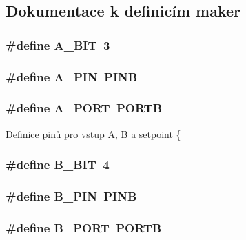 \subsection{Dokumentace k definicím maker}
\subsubsection[{A\_\-BIT}]{\setlength{\rightskip}{0pt plus 5cm}\#define A\_\-BIT~3}\label{irc2_8c_ae59e66b2ffaf088f18f894088f53205b}
\subsubsection[{A\_\-PIN}]{\setlength{\rightskip}{0pt plus 5cm}\#define A\_\-PIN~PINB}\label{irc2_8c_a955d6d7f3f806537072f993708e00f65}
\subsubsection[{A\_\-PORT}]{\setlength{\rightskip}{0pt plus 5cm}\#define A\_\-PORT~PORTB}\label{irc2_8c_ac9baf768fde81ade6f9ccde1d20d5a32}
Definice pinů pro vstup A, B a setpoint \{ 
\subsubsection[{B\_\-BIT}]{\setlength{\rightskip}{0pt plus 5cm}\#define B\_\-BIT~4}\label{irc2_8c_a07e5089fd757ebcad8929674eecf6c80}
\subsubsection[{B\_\-PIN}]{\setlength{\rightskip}{0pt plus 5cm}\#define B\_\-PIN~PINB}\label{irc2_8c_a45bd909a8fb5205b60cd8c8d6760db7a}
\subsubsection[{B\_\-PORT}]{\setlength{\rightskip}{0pt plus 5cm}\#define B\_\-PORT~PORTB}\label{irc2_8c_a04e1bd382a6de1a30d813bb79f30fb02}
